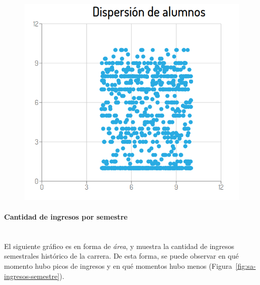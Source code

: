 \begin{figure}[H]
  \centering
    \includegraphics[scale=0.4]{images/seguimiento-academico/sa-dispersion.png}
  \label{fig:sa-dispersion}
\end{figure}

\paragraph{Cantidad de ingresos por semestre} \mbox{}\\
El siguiente gráfico es en forma de \textit{área}, y muestra la cantidad de ingresos semestrales histórico de la carrera. De esta forma, se puede observar en qué momento hubo picos de ingresos y en qué momentos hubo menos (Figura~\ref{fig:sa-ingresos-semestre}).

